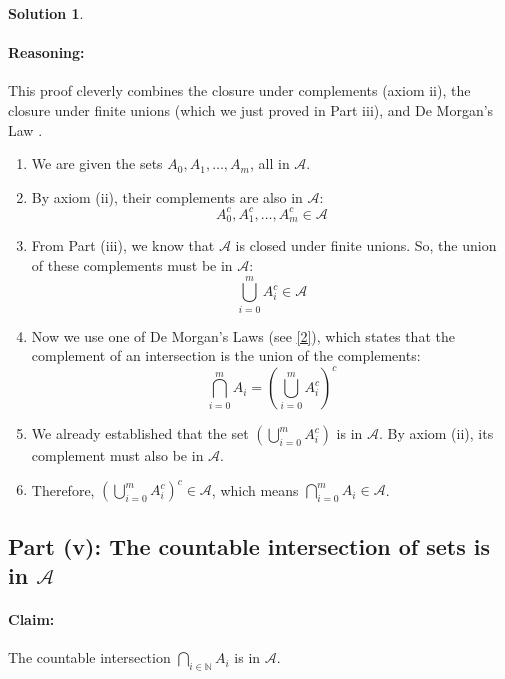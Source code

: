 \documentclass[11pt,a4paper]{article}
\theoremstyle{definition}
\newtheorem*{solution}{Solution}
\begin{document}
\begin{solution}
\paragraph{Reasoning:}
This proof cleverly combines the closure under complements (axiom ii), the closure under finite unions (which we just proved in Part iii), and De Morgan's Law \cite[Lemma 1.2]{script}.
\begin{enumerate}
    \item We are given the sets $A_0, A_1, \dots, A_m$, all in $\mathcal{A}$.
    \item By axiom (ii), their complements are also in $\mathcal{A}$:
    \[ A_0^c, A_1^c, \dots, A_m^c \in \mathcal{A} \]
    \item From Part (iii), we know that $\mathcal{A}$ is closed under finite unions. So, the union of these complements must be in $\mathcal{A}$:
    \[ \bigcup_{i=0}^{m} A_i^c \in \mathcal{A} \]
    \item Now we use one of De Morgan's Laws (see \hyperlink{note:demorgan}{[2]}), which states that the complement of an intersection is the union of the complements:
    \[ \bigcap_{i=0}^{m} A_i = \left( \bigcup_{i=0}^{m} A_i^c \right)^c \]
    \item We already established that the set $\left( \bigcup_{i=0}^{m} A_i^c \right)$ is in $\mathcal{A}$. By axiom (ii), its complement must also be in $\mathcal{A}$.
    \item Therefore, $\left( \bigcup_{i=0}^{m} A_i^c \right)^c \in \mathcal{A}$, which means $\bigcap_{i=0}^{m} A_i \in \mathcal{A}$.
\end{enumerate}

\subsection*{Part (v): The countable intersection of sets is in $\mathcal{A}$}

\paragraph{Claim:} The countable intersection $\bigcap_{i \in \mathbb{N}} A_i$ is in $\mathcal{A}$.


\end{solution}
\end{document}
